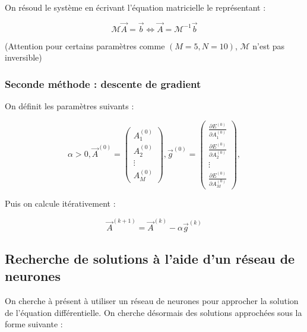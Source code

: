 \documentclass{article}
\begin{document}
On résoud le système en écrivant l'équation matricielle le représentant :

\begin{equation}
    \mathcal{M} \Vec{A} = \Vec{b} \Leftrightarrow \Vec{A} = \mathcal{M}^{-1}\Vec{b} 
\label{eq:équation matricielle}
\end{equation}

(Attention pour  certains paramètres comme $(M=5, N=10)$, $\mathcal{M}$ n'est pas inversible)

\subsubsection{Seconde méthode : descente de gradient}

On définit les paramètres suivants :

\begin{equation}
    \alpha>0, 
    \Vec{A}^{(0)} = \begin{pmatrix}
                A_1^{(0)} \\
                A_2^{(0)} \\
                \vdots \\
                A_M^{(0)}
              \end{pmatrix},
    \Vec{g}^{(0)} = \begin{pmatrix}
                \frac{\partial E^{(0)}}{\partial A_1^{(0)}} \\
                \frac{\partial E^{(0)}}{\partial A_2^{(0)}} \\
                \vdots \\
                \frac{\partial E^{(0)}}{\partial A_M^{(0)}}
              \end{pmatrix},     
\label{eq:définition descente de gradients}
\end{equation}

Puis on calcule itérativement :

\begin{equation}
    \Vec{A}^{(k+1)} = \Vec{A}^{(k)} - \alpha\Vec{g}^{(k)} 
\label{eq:équation récurrence descente gradients}
\end{equation}

\subsection{Recherche de solutions à l'aide d'un réseau de neurones}

On cherche à présent à utiliser un réseau de neurones pour approcher la solution de l'équation différentielle. On cherche désormais des solutions approchées sous la forme suivante :
\end{document}
